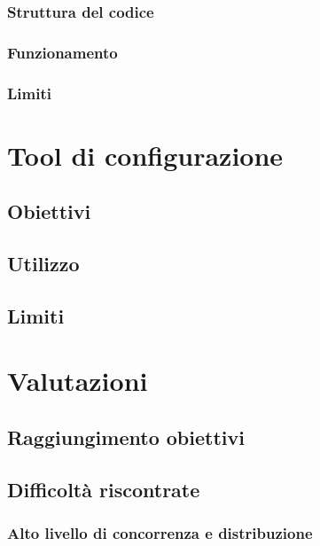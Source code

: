 \documentclass[acmtog]{acmart}
\begin{document}
\subsubsection{Struttura del codice}

\subsubsection{Funzionamento}

\subsubsection{Limiti}

\section{Tool di configurazione}
\subsection{Obiettivi}

\subsection{Utilizzo}

\subsection{Limiti}

\section{Valutazioni}
\subsection{Raggiungimento obiettivi}

\subsection{Difficoltà riscontrate}
\subsubsection{Alto livello di concorrenza e distribuzione}
\end{document}

